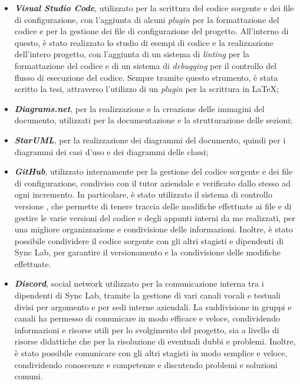 \begin{itemize}
    \item{\textit{\textbf{Visual Studio Code}}},  utilizzato per la scrittura del codice sorgente e dei file di configurazione, con l'aggiunta di alcuni \textit{plugin} per la formattazione del codice e per la gestione dei file di configurazione 
    del progetto. All'interno di questo, è stato realizzato lo studio di esempi di codice e la realizzazione dell'intero progetto, con l'aggiunta di un sistema di \textit{linting} per la formattazione del codice e di un sistema di \textit{debugging} per il controllo del flusso di esecuzione del codice.
    Sempre tramite questo strumento, è stata scritto la tesi, attraverso l'utilizzo di un \textit{plugin} per la scrittura in \LaTeX;\@
    
    \item{\textit{\textbf{Diagrams.net}}}, per la realizzazione e la creazione delle immagini del documento, utilizzati per la documentazione e la strutturazione delle sezioni;
    
    \item{\textit{\textbf{StarUML}}}, per la realizzazione dei diagrammi  del documento, quindi per i diagrammi dei casi d'uso e dei diagrammi delle classi;

    \item{\textit{\textbf{GitHub}}}, utilizzato internamente per la gestione del codice sorgente e dei file di configurazione, condiviso con il tutor aziendale e verificato dallo stesso ad ogni incremento.
    In particolare, è stato utilizzato il sistema di controllo versione , che permette di tenere traccia delle modifiche effettuate ai file e di gestire le varie versioni del codice e degli appunti interni 
    da me realizzati, per una migliore organizzazione e condivisione delle informazioni. Inoltre, è stato possibile condividere il codice sorgente con gli altri stagisti e dipendenti di Sync Lab,
    per garantire il versionamento e la condivisione delle modifiche effettuate.
    
    \item{\textit{\textbf{Discord}}}, social network utilizzato per la comunicazione interna tra i dipendenti di Sync Lab, 
    tramite la gestione di vari canali vocali e testuali divisi per argomento e per sedi interne aziendali. La suddivisione in gruppi e canali
    ha permesso di comunicare in modo efficace e veloce, condividendo informazioni e risorse utili per lo svolgimento del progetto, sia a livello di risorse 
    didattiche che per la risoluzione di eventuali dubbi e problemi. Inoltre, è stato possibile comunicare con gli altri stagisti in modo semplice e veloce,
    condividendo conoscenze e competenze e discutendo problemi e soluzioni comuni.
\end{itemize}

